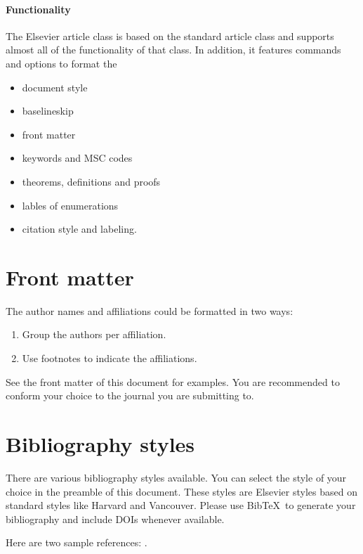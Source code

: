 \documentclass[review]{elsarticle}
\begin{document}
\paragraph{Functionality} The Elsevier article class is based on the standard article class and supports almost all of the functionality of that class. In addition, it features commands and options to format the
\begin{itemize}
\item document style
\item baselineskip
\item front matter
\item keywords and MSC codes
\item theorems, definitions and proofs
\item lables of enumerations
\item citation style and labeling.
\end{itemize}

\section{Front matter}

The author names and affiliations could be formatted in two ways:
\begin{enumerate}[(1)]
\item Group the authors per affiliation.
\item Use footnotes to indicate the affiliations.
\end{enumerate}
See the front matter of this document for examples. You are recommended to conform your choice to the journal you are submitting to.

\section{Bibliography styles}

There are various bibliography styles available. You can select the style of your choice in the preamble of this document. These styles are Elsevier styles based on standard styles like Harvard and Vancouver. Please use Bib\TeX\ to generate your bibliography and include DOIs whenever available.

Here are two sample references: \cite{Feynman1963118,Dirac1953888}.



\end{document}
